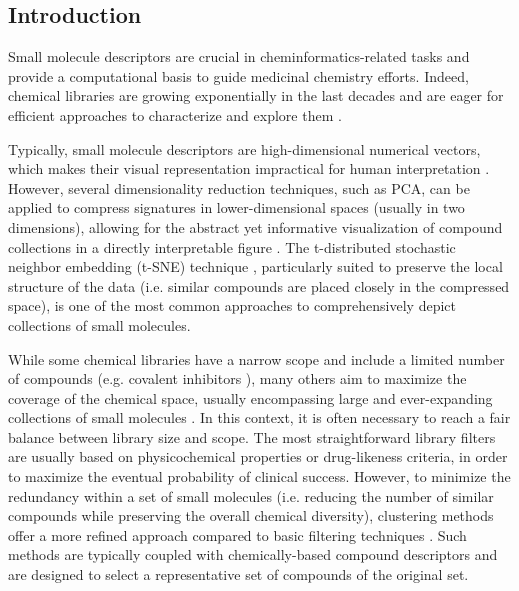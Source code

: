 \subsection{Introduction}

Small molecule descriptors are crucial in cheminformatics-related tasks and provide a computational basis to guide medicinal chemistry efforts\cite{mcgibbon_intuition_2023}. Indeed, chemical libraries are growing exponentially in the last decades and are eager for efficient approaches to characterize and explore them \cite{kim_pubchem_2023, irwin_zinc20free_2020}.

Typically, small molecule descriptors are high-dimensional numerical vectors, which makes their visual representation impractical for human interpretation \cite{cereto-massague_molecular_2015}. However, several dimensionality reduction techniques, such as PCA, can be applied to compress signatures in lower-dimensional spaces (usually in two dimensions), allowing for the abstract yet informative visualization of compound collections in a directly interpretable figure \cite{probst_visualization_2020, akella_cheminformatics_2010}. The t-distributed stochastic neighbor embedding (t-SNE) technique \cite{van_der_maaten_laurens_geoffrey_hinton_visualizing_2008}, particularly suited to preserve the local structure of the data (i.e. similar compounds are placed closely in the compressed space), is one of the most common approaches to comprehensively depict collections of small molecules. 

While some chemical libraries have a narrow scope and include a limited number of compounds (e.g. covalent inhibitors \cite{du_covalentindb_2021}), many others aim to maximize the coverage of the chemical space, usually encompassing large and ever-expanding collections of small molecules \cite{hoffmann_next_2019}. In this context, it is often necessary to reach a fair balance between library size and scope. The most straightforward library filters are usually based on physicochemical properties or drug-likeness criteria, in order to maximize the eventual probability of clinical success. However, to minimize the redundancy within a set of small molecules (i.e. reducing the number of similar compounds while preserving the overall chemical diversity), clustering methods offer a more refined approach compared to basic filtering techniques \cite{lipkowitz_clustering_2002}. Such methods are typically coupled with chemically-based compound descriptors and are designed to select a representative set of compounds of the original set. 

